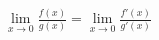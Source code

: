 \documentclass[preview]{standalone}
\begin{document}
\begin{align*}
\lim_{x \to 0} \frac{f(x)}{g(x)} = \lim_{x \to 0} \frac{f'(x)}{g'(x)}
\end{align*}
\end{document}
